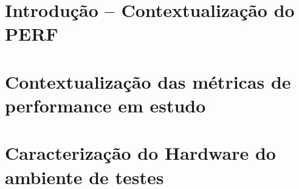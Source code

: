 \documentclass[conference,compsoc]{IEEEtran}
\begin{document}
  \maketitle







  \IEEEpeerreviewmaketitle






  \section{Introdução -- Contextualização do PERF}

  \section{Contextualização das métricas de performance em estudo}

  \section{Caracterização do Hardware do ambiente de testes}
  
\end{document}
